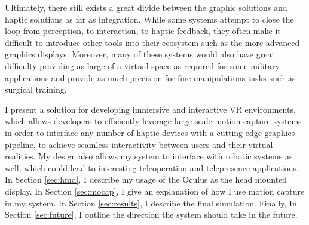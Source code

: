 Ultimately, there still exists a great divide between the graphic solutions and
haptic solutions as far as integration. While some systems attempt to close the
loop from perception, to interaction, to haptic feedback, they often make it
difficult to introduce other tools into their ecosystem such as the more
advanced graphics displays. Moreover, many of these systems would also have
great difficulty providing as large of a virtual space as required for some
military applications and provide as much precision for fine manipulations
tasks such as surgical training.

I present a solution for developing immersive and interactive VR environments,
which allows developers to efficiently leverage large scale motion capture
systems in order to interface any number of haptic devices with a cutting edge
graphics pipeline, to achieve seamless interactivity between users and their
virtual realities. My design also allows my system to interface with robotic
systems as well, which could lead to interesting teleoperation and telepresence
applications. In Section \ref{sec:hmd}, I describe my usage of the Oculus as
the head mounted display. In Section \ref{sec:mocap}, I give an explanation of
how I use motion capture in my system. In Section \ref{sec:results}, I describe
the final simulation. Finally, In Section \ref{sec:future}, I outline the
direction the system should take in the future.
